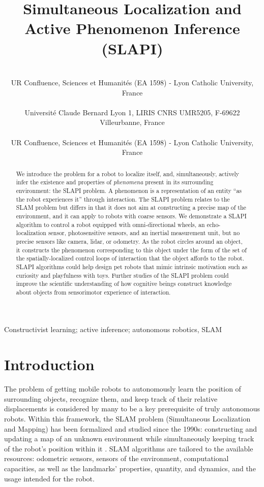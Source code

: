 \documentclass[pmlr]{jmlr}%
\title[SLAPI]{Simultaneous Localization and Active Phenomenon Inference (SLAPI)}
\author{\Name{Olivier L. Georgeon} \Email{ogeorgeon@univ-catholyon.fr}\\
  \addr UR Confluence, Sciences et Humanités (EA 1598) - Lyon Catholic University, France\\
  \Name{Titouan Knockaert} \Email{titouan.knockaert@gmail.com}\\
  \addr Université Claude Bernard Lyon 1, LIRIS CNRS UMR5205, F-69622 Villeurbanne, France\\
  \Name{Juan R. Vidal} \Email{jvidal@univ-catholyon.fr}\\
  \addr UR Confluence, Sciences et Humanités (EA 1598) - Lyon Catholic University, France
}
\begin{document}
\maketitle

\begin{abstract}
We introduce the problem for a robot to  localize itself, and, simultaneously, actively infer the existence and properties of \textit{phenomena} present in its surrounding environment: the SLAPI problem. 
A phenomenon is a representation of an entity ``as the robot experiences it'' through interaction. 
The SLAPI problem relates to the SLAM problem but differs in that it does not aim at constructing a precise map of the environment, and it can apply to robots with coarse sensors. 
We demonstrate a SLAPI algorithm to control a robot equipped with omni-directional wheels, an echo-localization sensor, photosensitive sensors, and an inertial measurement unit, but no precise sensors like camera, lidar, or odometry. 
As the robot circles around an object, it constructs the phenomenon corresponding to this object under the form of the set of the spatially-localized control loops of interaction that the object affords to the robot. 
SLAPI algorithms could help design pet robots that mimic intrinsic motivation such as curiosity and playfulness with toys. 
Further studies of the SLAPI problem could improve the scientific understanding of how cognitive beings construct knowledge about objects from sensorimotor experience of interaction.
\end{abstract}

\begin{keywords}
Constructivist learning; active inference; autonomous robotics, SLAM
\end{keywords}

\section{Introduction}
\label{sec:intro}

The problem of getting mobile robots to autonomously learn the position of surrounding objects, recognize them, and keep track of their relative displacements is considered by many to be a key prerequisite of truly autonomous robots. 
Within this framework, the SLAM problem (Simultaneous Localization and Mapping) has been formalized and studied since the 1990s: constructing and updating a map of an unknown environment while simultaneously keeping track of the robot's position within it \citep[e.g.,][]{taketomi_visual_2017}.
SLAM algorithms are tailored to the available resources: odometric sensors, sensors of the environment, computational capacities, as well as the landmarks' properties, quantity, and dynamics, and the usage intended for the robot.
\end{document}
